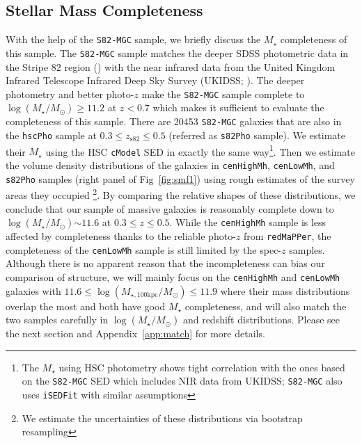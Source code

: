 \documentclass{emulateapj}
\def\redm{\texttt{redMaPPer}}
\def\rbcg{\texttt{cenHighMh}}
\def\nbcg{\texttt{cenLowMh}}
\def\mstar{{$M_{\star}$}}
\def\logms{{$\log (M_{\star}/M_{\odot})$}}
\def\logmtot{{$\log (M_{\star,100\mathrm{kpc}}/M_{\odot})$}}
\begin{document}
\begin{CJK*}{UTF8}{gbsn}
    \subsection{Stellar Mass Completeness}
    \label{ssec:complete}
    
    With the help of the \texttt{S82-MGC} sample, we briefly discuss the \mstar{} 
    completeness of this sample. 
    The \texttt{S82-MGC} sample matches the deeper SDSS photometric data in the 
    Stripe 82 region (\citealt{Annis2014}) with the near infrared data from the United 
    Kingdom Infrared Telescope Infrared Deep Sky Survey (UKIDSS; \citealt{Lawrence2007}). 
    The deeper photometry and better photo-$z$ make the \texttt{S82-MGC} sample complete 
    to \logms{}$\geq 11.2$ at $z<0.7$ which makes it sufficient to evaluate the 
    completeness of this sample.
    There are 20453 \texttt{S82-MGC} galaxies that are also in the \texttt{hscPho} 
    sample at $0.3 \leq z_{\mathrm{s82}} \leq 0.5$ (referred as \texttt{s82Pho} sample).   
    We estimate their \mstar{} using the HSC \texttt{cModel} SED in exactly the 
    same way\footnote{The \mstar{} using HSC photometry shows tight correlation with the 
    ones based on the \texttt{S82-MGC} SED which includes NIR data from UKIDSS; 
    \texttt{S82-MGC} also uses \texttt{iSEDFit} with similar assumptions}.  
    Then we estimate the volume density distributions of the galaxies in \rbcg{}, 
    \nbcg{}, and \texttt{s82Pho} samples (right panel of Fig~\ref{fig:smf1}) using 
    rough estimates of the survey areas they occupied \footnote{We estimate the 
    uncertainties of these distributions via bootstrap resampling}.
    By comparing the relative shapes of these distributions, we conclude that 
    our sample of massive galaxies is reasonably complete down to \logms{}$\sim 11.6$
    at $0.3 \leq z \leq 0.5$. 
    While the \rbcg{} sample is less affected by completeness thanks to the reliable
    photo-$z$ from \redm{}, the completeness of the \nbcg{} sample is still limited 
    by the spec-$z$ samples.
    Although there is no apparent reason that the incompleteness can bias our 
    comparison of structure, we will mainly focus on the \rbcg{} and \nbcg{} galaxies 
    with $11.6 \le$\logmtot{}$\le 11.9$ where their mass distributions overlap the 
    most and both have good \mstar{} completeness, and will also match the two samples 
    carefully in \logms{} and redshift distributions.
    Please see the next section and Appendix~\ref{app:match} for more details.


\end{CJK*}
\end{document}
